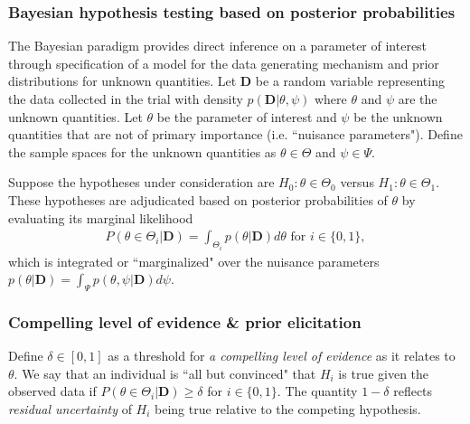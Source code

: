 \documentclass[12pt]{article}
\begin{document}
\subsubsection{Bayesian hypothesis testing based on posterior probabilities}

The Bayesian paradigm provides direct inference on a parameter of interest through specification of a model for the data generating mechanism and prior distributions for unknown quantities. Let $\mathbf{D}$ be a random variable representing the data collected in the trial with density $p(\mathbf{D}|\theta,\psi)$ where $\theta$ and $\psi$ are the unknown quantities. Let $\theta$ be the parameter of interest and $\psi$ be the unknown quantities that are not of primary importance (i.e. ``nuisance parameters"). Define the sample spaces for the unknown quantities as $\theta\in\Theta$ and $\psi\in\Psi$. 

Suppose the hypotheses under consideration are $H_0:\theta\in\Theta_0$ versus $H_1:\theta\in\Theta_1$. These hypotheses are adjudicated based on posterior probabilities of $\theta$ by evaluating its marginal likelihood 
\begin{align*}
P(\theta\in\Theta_i|\mathbf{D})=\int_{\Theta_i}p(\theta|\mathbf{D})d\theta\text{ for }i\in\{0,1\},
\end{align*}
 which is integrated or ``marginalized" over the nuisance parameters $p(\theta|\mathbf{D})=\int_{\Psi}p(\theta,\psi|\mathbf{D})d\psi$. 

\subsubsection{Compelling level of evidence \& prior elicitation}
Define $\delta\in[0,1]$ as a threshold for \textit{a compelling level of evidence} as it relates to $\theta$. We say that an individual is ``all but convinced" that $H_i$ is true given the observed data if $P(\theta\in\Theta_i|\mathbf{D})\geq\delta$ for $i\in\{0,1\}$. The quantity $1-\delta$ reflects \textit{residual uncertainty} of $H_i$ being true relative to the competing hypothesis. %
\end{document}
